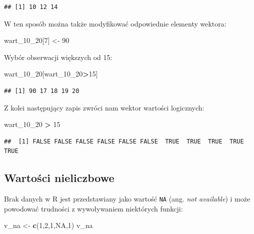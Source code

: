 \documentclass[]{book}
\newenvironment{Shaded}{\begin{snugshade}}{\end{snugshade}}
\newcommand{\KeywordTok}[1]{\textcolor[rgb]{0.13,0.29,0.53}{\textbf{#1}}}
\newcommand{\DecValTok}[1]{\textcolor[rgb]{0.00,0.00,0.81}{#1}}
\newcommand{\StringTok}[1]{\textcolor[rgb]{0.31,0.60,0.02}{#1}}
\newcommand{\OtherTok}[1]{\textcolor[rgb]{0.56,0.35,0.01}{#1}}
\newcommand{\OperatorTok}[1]{\textcolor[rgb]{0.81,0.36,0.00}{\textbf{#1}}}
\newcommand{\NormalTok}[1]{#1}
\begin{document}
\begin{verbatim}
## [1] 10 12 14
\end{verbatim}

W ten sposób można także modyfikować odpowiednie elementy wektora:

\begin{Shaded}
\begin{Highlighting}[]
\NormalTok{wart_10_}\DecValTok{20}\NormalTok{[}\DecValTok{7}\NormalTok{] <-}\StringTok{ }\DecValTok{90}
\end{Highlighting}
\end{Shaded}

Wybór obserwacji większych od 15:

\begin{Shaded}
\begin{Highlighting}[]
\NormalTok{wart_10_}\DecValTok{20}\NormalTok{[wart_10_}\DecValTok{20}\OperatorTok{>}\DecValTok{15}\NormalTok{]}
\end{Highlighting}
\end{Shaded}

\begin{verbatim}
## [1] 90 17 18 19 20
\end{verbatim}

Z kolei następujący zapis zwróci nam wektor wartości logicznych:

\begin{Shaded}
\begin{Highlighting}[]
\NormalTok{wart_10_}\DecValTok{20} \OperatorTok{>}\StringTok{ }\DecValTok{15}
\end{Highlighting}
\end{Shaded}

\begin{verbatim}
##  [1] FALSE FALSE FALSE FALSE FALSE FALSE  TRUE  TRUE  TRUE  TRUE  TRUE
\end{verbatim}

\subsection{Wartości nieliczbowe}\label{wartosci-nieliczbowe}

Brak danych w R jest przedstawiany jako wartość \texttt{NA} (ang.
\emph{not available}) i może powodować trudności z wywoływaniem
niektórych funkcji:

\begin{Shaded}
\begin{Highlighting}[]
\NormalTok{v_na <-}\StringTok{ }\KeywordTok{c}\NormalTok{(}\DecValTok{1}\NormalTok{,}\DecValTok{2}\NormalTok{,}\DecValTok{1}\NormalTok{,}\OtherTok{NA}\NormalTok{,}\DecValTok{1}\NormalTok{)}
\NormalTok{v_na}
\end{Highlighting}
\end{Shaded}
\end{document}
